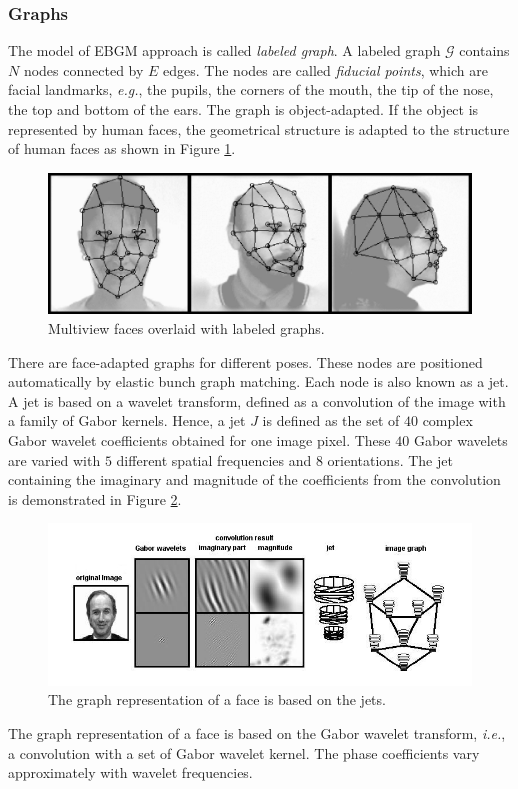 \subsubsection{Graphs}
The model of EBGM approach is called \textit{labeled graph}. A labeled graph $\mathcal{G}$ contains $N$ nodes connected by $E$ edges. The nodes are called \textit{fiducial points}, which are facial landmarks, \textit{e.g.}, the pupils, the corners of the mouth, the tip of the nose, the top and bottom of the ears. The graph is object-adapted. If the object is represented by human faces, the geometrical structure is adapted to the structure of human faces as shown in \mbox{Figure} \ref{fig:graphs}.
\begin{figure}[ht]
 \begin{center}
  \includegraphics[width=0.77\columnwidth]{ch2/figures/EBGMgrid.jpg}
  \caption{Multiview faces overlaid with labeled graphs. \cite{Wiskott1997}}
  \label{fig:graphs}
 \end{center}
\end{figure} 
There are face-adapted graphs for different poses. These nodes are positioned automatically by elastic bunch graph matching. Each node is also known as a jet. A jet is based on a wavelet transform, defined as a convolution of the image with a family of Gabor kernels. Hence, a jet $J$ is defined as the set of $40$ complex Gabor wavelet coefficients obtained for one image pixel. These $40$ Gabor wavelets are varied with $5$ different spatial frequencies and $8$ orientations. The jet containing the imaginary and magnitude of the coefficients from the convolution is demonstrated in \mbox{Figure} \ref{fig:AGaborJet}.
\begin{figure}[ht]
 \begin{center}
  \includegraphics[width=\columnwidth]{ch2/figures/AJet.jpg}
  \caption{The graph representation of a face is based on the jets. \cite{Wiskott1999}}
  \label{fig:AGaborJet}
 \end{center}
\end{figure}  
The graph representation of a face is based on the Gabor wavelet transform, \textit{i.e.}, a convolution with a set of Gabor wavelet kernel. The phase coefficients vary approximately with wavelet frequencies. %

